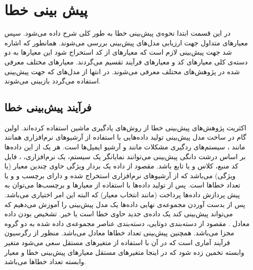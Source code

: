 \section{پیش بینی خطا}
\label{sec:bug-predict}
در این قسمت ابتدا نحوه‌ی پیش‌بینی خطا به طور کلی شرح داده می‌شود. سپس معیارهای متداول جهت ارزیابی مدل‌های پیش‌بینی بررسی می‌شوند. همانطور که اشاره شد جهت پیش‌بینی لازم است که معیارهای از کد استخراج شود این معیارها به دو دسته‌ی کلی معیارهای کد و معیارهای فرآیند تقسیم می‌گردند. معیارهای مختلف معرفی شده در پژوهش‌های محتلف معرفی می‌شوند. در انتها از مدل‌های که جهت پیش‌بینی استفاده می‌گردد بازبینی می‌شوند. 

\subsection{فرآیند پیش‌بینی خطا}
\label{subsec:process}
اکثریت پژوهش‌های پیش‌بینی خطا از روش‌های یادگیری ماشین  استفاده کرده‌اند. اولین گام در ساخت مدل پیش‌بینی تولید داده‌هایی با استفاده از آرشیو‌های نرم‌افزاری همانند  مانند ، سیستم‌های ردگیری مشکلات  مانند  و آرشیو ایمیل‌ها است. هر یک از این داده‌ها بر اساس درشت دانگی پیش‌بینی می‌توانند نمایانگر یک سیستم، یک  نرم‌افزاری، ، فایل کد منبع، کلاس و یا تابع باشد. مقصود از داده یک بردار ویژگی حاوی چندین معیار (یا ویژگی) می‌باشد که از آرشیو‌های نرم‌افزاری استخراج شده و دارای برچسب  و    و یا تعداد خطاها است. پس از تولید داده‌ها با استفاده از معیارها و برچسب‌ها می‌توان به پیش پردازش داده‌ها پرداخت (مانند انتخاب معیار) که البته این امر اختیاری می‌باشد. پس از بدست آوردن مجموعه‌ی نهایی داده‌ها یک مدل پیش‌بینی را آموزش می‌دهیم که می‌تواند پیش‌بینی کند یک داده‌ی جدید حاوی خطا است یا خیر. تشخیص  بودن داده معادل . مقصود از دسته‌بندی دوتایی، دسته‌بندی عناصر مجموعه‌ی داده شده به دو گروه مجزا می‌باشد. همچنین پیش‌بینی تعداد خطاها معادل  می‌باشد.  منظور از رگرسیون فرآیند آماری است که در آن با استفاده از متغیرهای مستقل سعی می‌شود متغیر وابسته تخمین زده شود که در اینجا متغیرهای مستقل معیارهای پیش‌بینی خطا و معیار وابسته تعداد خطاها می‌باشد. 

